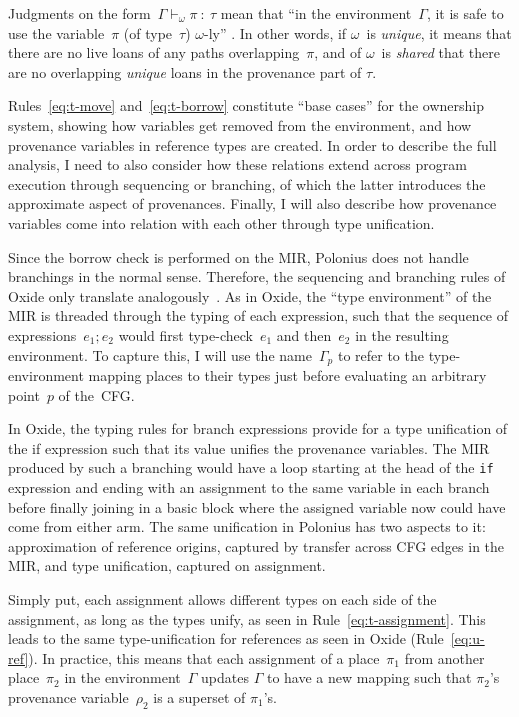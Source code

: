 \documentclass[11pt,a4paper,twoside,openany]{report}
\newcommand{\InRust}[1]{\texttt{#1}}
\newcommand{\expression}[1]{\boxed{#1}}
\begin{document}
Judgments on the form~$\Gamma \vdash_{\omega} \pi \: : \: \tau$ mean that ``in
the environment~$\Gamma$, it is safe to use the variable~$\pi$ (of type~$\tau$)
$\omega$-ly'' \cite{weiss_oxide:_2019}. In other words, if $\omega$~is
\emph{unique}, it means that there are no live loans of any paths
overlapping~$\pi$, and of $\omega$~is \emph{shared} that there are no
overlapping \emph{unique} loans in the provenance part of $\tau$.

Rules~\eqref{eq:t-move} and~\eqref{eq:t-borrow} constitute ``base cases'' for
the ownership system, showing how variables get removed from the environment,
and how provenance variables in reference types are created. In order to
describe the full analysis, I need to also consider how these relations extend
across program execution through sequencing or branching, of which the latter
introduces the approximate aspect of provenances. Finally, I will also describe
how provenance variables come into relation with each other through type
unification.

Since the borrow check is performed on the MIR, Polonius does not handle
branchings in the normal sense. Therefore, the sequencing and branching rules of
Oxide only translate analogously~\cite{weiss_oxide:_2019}. As in Oxide, the
``type environment'' of the MIR is threaded through the typing of each
expression, such that the sequence of expressions~$\expression{e_1; e_2}$ would
first type-check~$e_1$ and then~$e_2$ in the resulting environment. To capture
this, I will use the name~$\Gamma_p$ to refer to the type-environment mapping
places to their types just before evaluating an arbitrary point~$p$ of the~CFG.

In Oxide, the typing rules for branch expressions provide for a type unification
of the if expression such that its value unifies the provenance variables. The
MIR produced by such a branching would have a loop starting at the head of the
\InRust{if} expression and ending with an assignment to the same variable in
each branch before finally joining in a basic block where the assigned variable
now could have come from either arm. The same unification in Polonius has two
aspects to it: approximation of reference origins, captured by transfer across
CFG edges in the MIR, and type unification, captured on assignment.

Simply put, each assignment allows different types on each side of the
assignment, as long as the types unify, as seen in Rule~\eqref{eq:t-assignment}.
This leads to the same type-unification for references as seen in Oxide
(Rule~\eqref{eq:u-ref}). In practice, this means that each assignment of a
place~$\pi_1$ from another place~$\pi_2$ in the environment~$\Gamma$ updates
$\Gamma$ to have a new mapping such that $\pi_2$'s provenance variable~$\rho_2$
is a superset of $\pi_1$'s.
\end{document}
